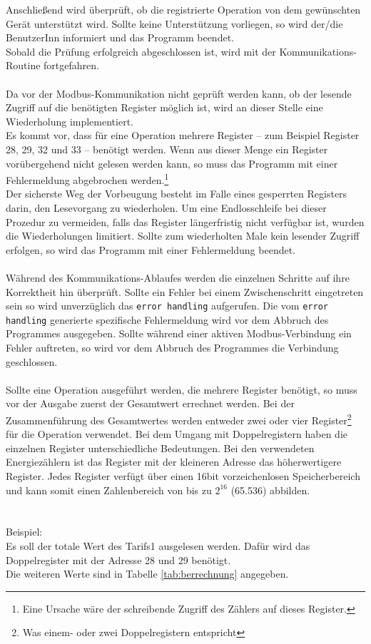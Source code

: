 \documentclass[Bachelorarbeit.tex]{subfiles}
\begin{document}
Anschließend wird überprüft, ob die registrierte Operation von dem gewünschten 
Gerät unterstützt wird. Sollte keine Unterstützung vorliegen, so wird der/die 
BenutzerInn informiert und das Programm beendet.\\
Sobald die Prüfung 
erfolgreich abgeschlossen ist, wird mit der Kommunikations-Routine fortgefahren. \\
\\
Da vor der Modbus-Kommunikation nicht geprüft werden kann, ob der lesende Zugriff auf die benötigten Register möglich ist, wird an dieser Stelle eine Wiederholung implementiert.
\\
Es kommt vor, dass für eine Operation mehrere Register  –  zum Beispiel 
Register 28, 29, 32 und 33  –  benötigt werden.  Wenn aus dieser Menge 
ein  Register  vorübergehend nicht  gelesen  werden  kann,  so  muss  das 
Programm  mit  einer  Fehlermeldung  abgebrochen werden.\footnote{Eine Ursache wäre der schreibende Zugriff des Zählers auf dieses Register.}  \\
Der sicherste Weg  der  Vorbeugung  besteht  im  Falle  eines  gesperrten 
Registers  darin,  den  Lesevorgang  zu  wiederholen.  Um  eine
Endlosschleife  bei  dieser  Prozedur  zu  vermeiden,  falls das
Register  längerfristig  nicht  verfügbar  ist,  wurden  die  Wiederholungen 
limitiert.  Sollte  zum  wiederholten  Male  kein  lesender  Zugriff  erfolgen, so wird das Programm mit einer Fehlermeldung beendet.\\
\\
Während des Kommunikations-Ablaufes werden die einzelnen Schritte auf ihre Korrektheit hin überprüft.
Sollte ein Fehler bei einem Zwischenschritt eingetreten sein so wird unverzüglich das \texttt{error handling} aufgerufen. 
Die vom \texttt{error handling} generierte spezifische Fehlermeldung wird vor dem Abbruch des Programmes ausgegeben.
Sollte während einer aktiven Modbus-Verbindung ein Fehler auftreten, so wird vor dem Abbruch des Programmes die Verbindung geschlossen.\\
\\
Sollte eine Operation ausgeführt werden, die mehrere Register benötigt, so muss vor der Ausgabe zuerst der Gesamtwert errechnet werden. 
Bei der Zusammenführung des Gesamtwertes werden entweder zwei oder vier Register\footnote{Was einem-  oder zwei Doppelregistern entspricht} für die Operation verwendet. 
Bei dem Umgang mit Doppelregistern haben die einzelnen Register unterschiedliche Bedeutungen. 
Bei den verwendeten Energiezählern ist das Register mit der kleineren Adresse das höherwertigere Register. 
Jedes Register verfügt über einen  16bit vorzeichenlosen Speicherbereich und kann somit  einen 
Zahlenbereich von bis  zu  $2^{16}$ (65.536) abbilden. \parencites[vgl.][]{datenblatt_ald1}[und][]{datenblatt_ale3}\\
\\\\
Beispiel:\\
Es  soll  der  totale  Wert  des  Tarifs1  ausgelesen  werden.  Dafür  wird  das 
Doppelregister mit der Adresse 28 und 29 benötigt.\\
Die weiteren Werte sind in Tabelle \ref{tab:berrechnung} angegeben.\\
\end{document}
